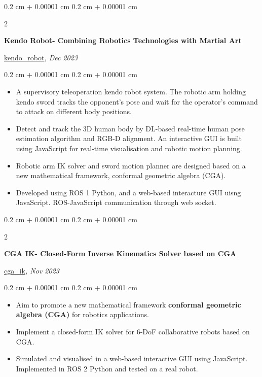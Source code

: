\documentclass[10pt, letterpaper]{article}
\newenvironment{highlights}{
    \begin{itemize}[
        topsep=0.10 cm,
        parsep=0.10 cm,
        partopsep=0pt,
        itemsep=0pt,
        leftmargin=0.4 cm + 10pt
    ]
}{
    \end{itemize}
} %
\newenvironment{onecolentry}{
    \begin{adjustwidth}{
        0.2 cm + 0.00001 cm
    }{
        0.2 cm + 0.00001 cm
    }
}{
    \end{adjustwidth}
} %
\newenvironment{twocolentry}[2][]{
    \onecolentry
    \def\secondColumn{#2}
    \setcolumnwidth{\fill, 4.5 cm}
    \begin{paracol}{2}
}{
    \switchcolumn \raggedleft \secondColumn
    \end{paracol}
    \endonecolentry
} %
\let\hrefWithoutArrow\href
\renewcommand{\href}[2]{\hrefWithoutArrow{#1}{\ifthenelse{\equal{#2}{}}{ }{#2 }\raisebox{.15ex}{\footnotesize \faExternalLink*}}}
\begin{document}
        \begin{twocolentry}{
        \hrefWithoutArrow{https://github.com/wei-hsuan-cheng/kendo_robot}{{\footnotesize\faGithub}\hspace*{0.13cm}kendo\_robot}\textit{, Dec 2023}
        }
            \textbf{Kendo Robot- Combining Robotics Technologies with Martial Art}
        \end{twocolentry}
        \vspace{0.10 cm}
        \begin{onecolentry}
            \begin{highlights}
                \item A supervisory teleoperation kendo robot system. The robotic arm holding kendo sword tracks the opponent’s pose and wait for the operator’s command to attack on different body positions.
                \item Detect and track the 3D human body by DL-based real-time human pose estimation algorithm and RGB-D alignment. An interactive GUI is built using JavaScript for real-time visualisation and robotic motion planning.
                \item Robotic arm IK solver and sword motion planner are designed based on a new mathematical framework, conformal geometric algebra (CGA).
                \item Developed using ROS 1 Python, and a web-based interacture GUI uisng JavaScript. ROS-JavaScript communication through web socket.
            \end{highlights}
        \end{onecolentry}

        \vspace{0.2 cm}

        \begin{twocolentry}{
        \hrefWithoutArrow{https://github.com/wei-hsuan-cheng/cga_ik}{{\footnotesize\faGithub}\hspace*{0.13cm}cga\_ik}\textit{, Nov 2023}
        }
            \textbf{CGA IK- Closed-Form Inverse Kinematics Solver based on CGA}
        \end{twocolentry}
        \vspace{0.10 cm}
        \begin{onecolentry}
            \begin{highlights}
                \item Aim to promote a new mathematical framework \textbf{conformal geometric algebra (CGA)} for robotics applications. 
                \item Implement a closed-form IK solver for 6-DoF collaborative robots based on CGA.
                \item Simulated and visualised in a web-based interactive GUI using JavaScript. Implemented in  ROS 2 Python and tested on a real robot.
            \end{highlights}
        \end{onecolentry}
\end{document}
